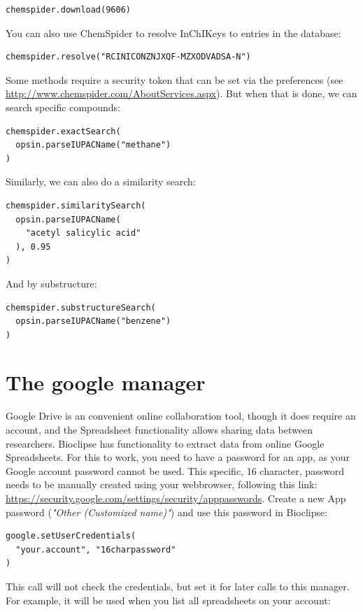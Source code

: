 \documentclass[a5paper, 10pt]{memoir}
\begin{document}
\begin{refsection}
\begin{Verbatim}
chemspider.download(9606)
\end{Verbatim}
You can also use ChemSpider to resolve InChIKeys to entries in the
database:

\begin{Verbatim}
chemspider.resolve("RCINICONZNJXQF-MZXODVADSA-N")
\end{Verbatim}
Some methods require a security token that can be set via the preferences (see
\url{http://www.chemspider.com/AboutServices.aspx}). But when that is done, we
can search specific compounds:

\begin{Verbatim}
chemspider.exactSearch(
  opsin.parseIUPACName("methane")
)
\end{Verbatim}
Similarly, we can also do a similarity search:

\begin{Verbatim}
chemspider.similaritySearch(
  opsin.parseIUPACName(
    "acetyl salicylic acid"
  ), 0.95
)
\end{Verbatim}
And by substructure:

\begin{Verbatim}
chemspider.substructureSearch(
  opsin.parseIUPACName("benzene")
)
\end{Verbatim}

\section{The google manager}

Google Drive is an convenient online collaboration tool, though it does
require an account, and the Spreadsheet functionality allows sharing data between
researchers. Bioclipse has functionality to extract data from online Google
Spreadsheets. For this to work, you need to have a password for an app, as
your Google account password cannot be used. This specific, 16 character, password
needs to be manually created using your webbrowser, following this link:
\url{https://security.google.com/settings/security/apppasswords}. Create a new
App password (\textit{"Other (Customized name)"}) and use this password in Bioclipse:

\begin{Verbatim}
google.setUserCredentials(
  "your.account", "16charpassword"
)
\end{Verbatim}

This call will not check the credentials, but set it for later calls to this
manager. For example, it will be used when you list all spreadsheets on your
account:


\end{refsection}
\end{document}
